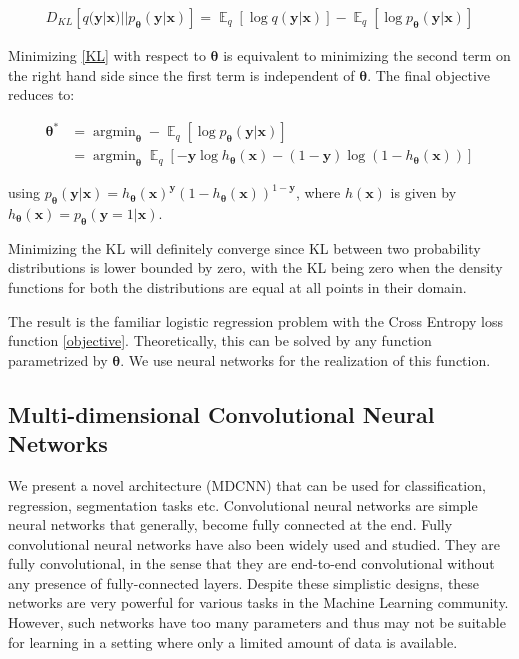 \documentclass[journal]{IEEEtran}
\newcommand{\bx}{\bm{x}}
\newcommand{\by}{\bm{y}}
\newcommand{\btheta}{\bm{\theta}}
\DeclareMathOperator{\expectation}{\mathbb{E}}
\DeclareMathOperator*{\argmin}{argmin}
\begin{document}
\begin{equation}
	\label{KL}
	\begin{aligned}
		D_{KL} \left[ q (\by | \bx) || p_{\btheta} (\by | \bx) \right] = \expectation_q [\log q (\by | \bx)] - \expectation_q [\log p_{\btheta} (\by | \bx)]
	\end{aligned}
\end{equation}

Minimizing \eqref{KL} with respect to $\btheta$ is equivalent to minimizing the second term on the right hand side since the first term is independent of $\btheta$. The final objective reduces to:

\begin{equation}
	\label{objective}
	\begin{aligned}
		\btheta ^ * & = \argmin_{\btheta} - \expectation_q [\log p_{\btheta} (\by | \bx)]
		\\
		& = \argmin_{\btheta} \expectation_q [- \by \log h_{\btheta} (\bx) - (1 - \by) \log (1 - h_{\btheta} (\bx))]
	\end{aligned}
\end{equation}

using $p_{\btheta} (\by | \bx) = h_{\btheta} (\bx) ^ {\by} (1 - h_{\btheta} (\bx)) ^ {1 - \by}$, where $h(\bx)$ is given by $h_{\btheta} (\bx) = p_{\btheta} (\by = 1 | \bx)$.

Minimizing the KL will definitely converge since KL between two probability distributions is lower bounded by zero, with the KL being zero when the density functions for both the distributions are equal at all points in their domain.

The result is the familiar logistic regression problem with the Cross Entropy loss function \eqref{objective}. Theoretically, this can be solved by any function parametrized by $\btheta$. We use neural networks for the realization of this function.

\subsection{Multi-dimensional Convolutional Neural Networks}
We present a novel architecture (MDCNN) that can be used for classification, regression, segmentation tasks etc. Convolutional neural networks\cite{CNN} are simple neural networks that generally, become fully connected at the end. Fully convolutional neural networks have also been widely used and studied. They are fully convolutional, in the sense that they are end-to-end convolutional without any presence of fully-connected layers. Despite these simplistic designs, these networks are very powerful for various tasks in the Machine Learning community. However, such networks have too many parameters and thus may not be suitable for learning in a setting where only a limited amount of data is available.
\end{document}
